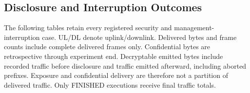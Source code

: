 \subsection{Disclosure and Interruption Outcomes}

The following tables retain every registered security and management-interruption case. UL/DL denote uplink/downlink. Delivered bytes and frame counts include complete delivered frames only. Confidential bytes are retrospective through experiment end. Decryptable emitted bytes include recorded traffic before disclosure and traffic emitted afterward, including aborted prefixes. Exposure and confidential delivery are therefore not a partition of delivered traffic. Only FINISHED executions receive final traffic totals.

\begingroup\footnotesize
\setlength{\tabcolsep}{2pt}\renewcommand{\arraystretch}{1.12}
